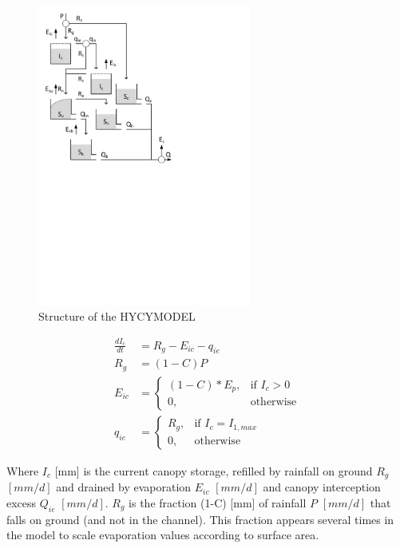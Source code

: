 { 																	%
\begin{figure}
\includegraphics[trim=1cm 14.5cm 7cm 1cm,width=7cm,keepaspectratio]{./AppA_files/42_schematic.pdf}
\caption{Structure of the HYCYMODEL} \label{fig:00_schematic}
\end{figure}

\begin{align}
	\frac{dI_c}{dt} &= R_g-E_{ic} -q_{ie} \\
	R_g &= (1-C)P\\
	E_{ic} &= 
	\begin{cases}
		(1-C)*E_p, & \text{if } I_c > 0 \\
		0, & \text{otherwise}
	\end{cases}\\
	q_{ie} &= 	\begin{cases}
		R_g, & \text{if } I_c = I_{1,max} \\
		0, & \text{otherwise}
	\end{cases}
\end{align}

Where $I_c$ [mm] is the current canopy storage, refilled by rainfall on ground $R_g$ $[mm/d]$ and drained by evaporation $E_{ic}$ $[mm/d]$ and canopy interception excess $Q_{ie}$ $[mm/d]$.
$R_g$ is the fraction (1-C) [mm] of rainfall $P$ $[mm/d]$ that falls on ground (and not in the channel).
This fraction appears several times in the model to scale evaporation values according to surface area.

} %

